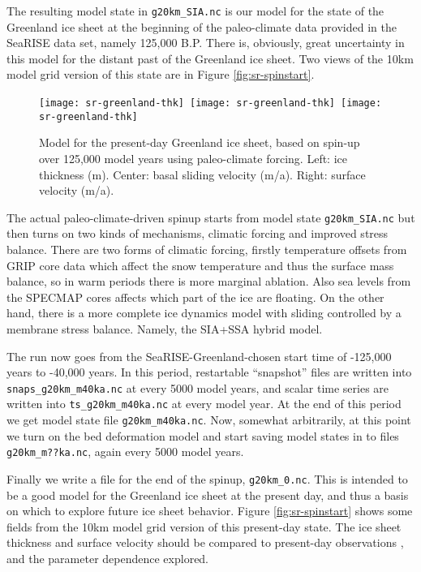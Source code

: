 The resulting model state in \texttt{g20km_SIA.nc} is our model for the state of the Greenland ice sheet at the beginning of the paleo-climate data provided in the SeaRISE data set, namely 125,000 B.P.  There is, obviously, great uncertainty in this model for the distant past of the Greenland ice sheet.  Two views of the 10km model grid version of this state are in Figure \ref{fig:sr-spinstart}.

\begin{figure}[ht]
\centering
\mbox{\texttt{[image: sr-greenland-thk]}
  \qquad \texttt{[image: sr-greenland-thk]}
  \qquad \texttt{[image: sr-greenland-thk]}}
\caption{Model for the present-day Greenland ice sheet, based on spin-up over 125,000 model years using paleo-climate forcing.  Left: ice thickness (m).  Center: basal sliding velocity (m/a).  Right: surface velocity (m/a).}
\label{fig:sr-spindone-map}
\end{figure}


The actual paleo-climate-driven spinup starts from model state \texttt{g20km_SIA.nc} but then turns on two kinds of mechanisms, climatic forcing and improved stress balance.  There are two forms of climatic forcing, firstly temperature offsets from GRIP core data which affect the snow temperature and thus the surface mass balance, so in warm periods there is more marginal ablation.  Also sea levels from the SPECMAP cores affects which part of the ice are floating.  On the other hand, there is a more complete ice dynamics model with sliding controlled by a membrane stress balance.  Namely, the SIA+SSA hybrid model.

The run now goes from the SeaRISE-Greenland-chosen start time of -125,000 years to -40,000 years.  In this period, restartable ``snapshot'' files are written into \texttt{snaps_g20km_m40ka.nc} at every 5000 model years, and scalar time series are written into \texttt{ts_g20km_m40ka.nc} at every model year.  At the end of this period we get model state file \texttt{g20km_m40ka.nc}.  Now, somewhat arbitrarily, at this point we turn on the bed deformation model and start saving model states in to files \texttt{g20km_m??ka.nc}, again every 5000 model years.

Finally we write a file for the end of the spinup, \texttt{g20km_0.nc}.  This is intended to be a good model for the Greenland ice sheet at the present day, and thus a basis on which to explore future ice sheet behavior.  Figure \ref{fig:sr-spinstart} shows some fields from the 10km model grid version of this present-day state.  The ice sheet thickness and surface velocity should be compared to present-day observations \cite{BKAJS}, and the parameter dependence explored.

